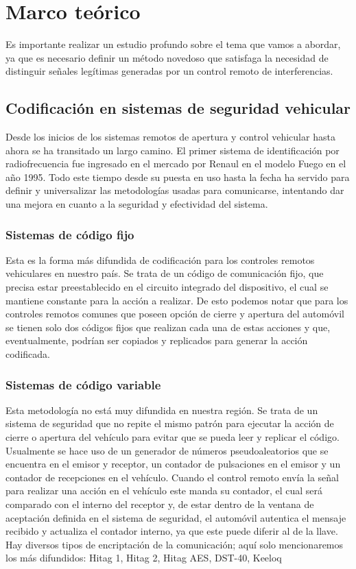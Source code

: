 \documentclass[12pt]{report}
\begin{document}
\section{Marco teórico}


Es importante realizar un estudio profundo sobre el tema que vamos a abordar, ya que es necesario definir un método novedoso que satisfaga
la necesidad de distinguir señales legítimas generadas por un control remoto de interferencias.

\subsection{Codificación en sistemas de seguridad vehicular}

Desde los inicios de los sistemas remotos de apertura y control vehicular hasta ahora se ha transitado un largo camino. 
El primer sistema de identificación por radiofrecuencia fue ingresado en el mercado por Renaul en el modelo Fuego en el año 1995.
Todo este tiempo desde su puesta en uso hasta la fecha ha servido para definir y universalizar las metodologías usadas para comunicarse,
intentando dar una mejora en cuanto a la seguridad y efectividad del sistema.\par

\subsubsection{Sistemas de código fijo}

Esta es la forma más difundida de codificación para los controles remotos vehiculares en nuestro país. Se trata de un código de comunicación
fijo, que precisa estar preestablecido en el circuito integrado del dispositivo, el cual se mantiene constante para la acción a realizar.
De esto podemos notar que para los controles remotos comunes que poseen opción de cierre y apertura del automóvil se tienen solo dos códigos
fijos que realizan cada una de estas acciones y que, eventualmente, podrían ser copiados y replicados para generar la acción codificada. 

\subsubsection{Sistemas de código variable}

Esta metodología no está muy difundida en nuestra región. Se trata de un sistema de seguridad que no repite el mismo patrón para ejecutar la 
acción de cierre o apertura del vehículo para evitar que se pueda leer y replicar el código. Usualmente se hace uso de un generador de números 
pseudoaleatorios que se encuentra en el emisor y receptor, un contador de pulsaciones en el emisor y un contador de recepciones en el vehículo.
Cuando el control remoto envía la señal para realizar una acción en el vehículo este manda su contador, el cual será comparado con el 
interno del receptor y, de estar dentro de la ventana de aceptación definida en el sistema de seguridad, el automóvil autentica el mensaje 
recibido y actualiza el contador interno, ya que este puede diferir al de la llave.
Hay diversos tipos de encriptación de la comunicación; aquí solo mencionaremos los más difundidos: Hitag 1, Hitag 2, Hitag AES, DST-40, Keeloq
\end{document}
